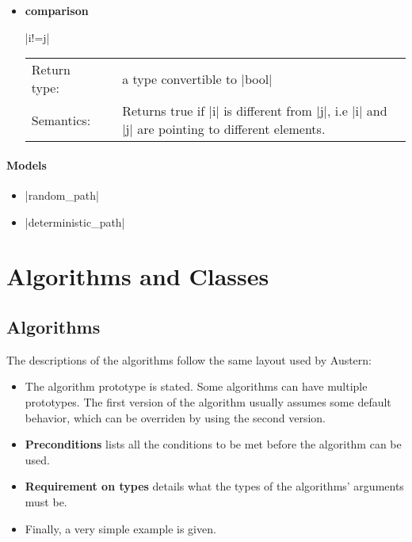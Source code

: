 \documentclass[12pt,twoside]{report}
\begin{document}
\begin{itemize}
\item {\bf comparison}

  |i!=j|

  \begin{tabular}[!h]{l p{1cm} p{10cm}}
    Return type: & & a type convertible to |bool|\\
    Semantics: & & Returns true if |i| is different from |j|, i.e |i| and |j| are pointing to different elements.\\
  \end{tabular}



\end{itemize}



\htmlrule[CLEAR=all]  \subsubsection*{Models}
\begin{itemize}
\item |random_path|
\item |deterministic_path|
\end{itemize}





\chapter{Algorithms and Classes}
\label{reference}


\section{Algorithms}
\label{algo}
The descriptions of the algorithms follow the same layout used by Austern:

\begin{itemize}
\item The algorithm prototype is stated. Some algorithms can have multiple prototypes. The first version of the algorithm usually assumes some default behavior, which can be overriden by using the second version.
\item  {\bf Preconditions} lists all the conditions to be met before the algorithm can be used.
\item {\bf Requirement on types} details what the types of the algorithms' arguments must be.
\item Finally, a very simple example is given.
\end{itemize}
 
\end{document}
